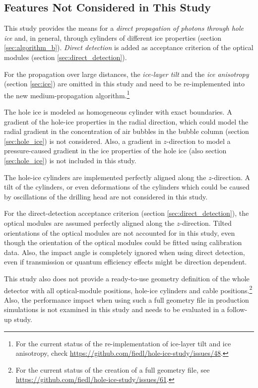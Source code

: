 
\subsection{Features Not Considered in This Study}
\label{sec:ice_features_not_considered}

This study provides the means for a \textit{direct propagation of photons through hole ice} and, in general, through cylinders of different ice properties (section \ref{sec:algorithm_b}). \textit{Direct detection} is added as acceptance criterion of the optical modules (section \ref{sec:direct_detection}).

For the propagation over large distances, the \textit{ice-layer tilt} and the \textit{ice anisotropy} (section \ref{sec:ice}) are omitted in this study and need to be re-implemented into the new medium-propagation algorithm.\footnote{For the current status of the re-implementation of ice-layer tilt and ice anisotropy, check \url{https://github.com/fiedl/hole-ice-study/issues/48}.}

The hole ice is modeled as homogeneous cylinder with exact boundaries. A gradient of the hole-ice properties in the radial direction, which could model the radial gradient in the concentration of air bubbles in the bubble column (section \ref{sec:hole_ice}) is not considered. Also, a gradient in $z$-direction to model a pressure-caused gradient in the ice properties of the hole ice (also section \ref{sec:hole_ice}) is not included in this study.

The hole-ice cylinders are implemented perfectly aligned along the $z$-direction. A tilt of the cylinders, or even deformations of the cylinders which could be caused by oscillations of the drilling head are not considered in this study.

For the direct-detection acceptance criterion (section \ref{sec:direct_detection}), the optical modules are assumed perfectly aligned along the $z$-direction. Tilted orientations of the optical modules are not accounted for in this study, even though the orientation of the optical modules could be fitted using calibration data. Also, the impact angle is completely ignored when using direct detection, even if transmission or quantum efficiency effects might be direction dependent.

This study also does not provide a ready-to-use geometry definition of the whole detector with all optical-module positions, hole-ice cylinders and cable positions.\footnote{For the current status of the creation of a full geometry file, see \url{https://github.com/fiedl/hole-ice-study/issues/61}.} Also, the performance impact when using such a full geometry file in production simulations is not examined in this study and needs to be evaluated in a follow-up study.\followup

